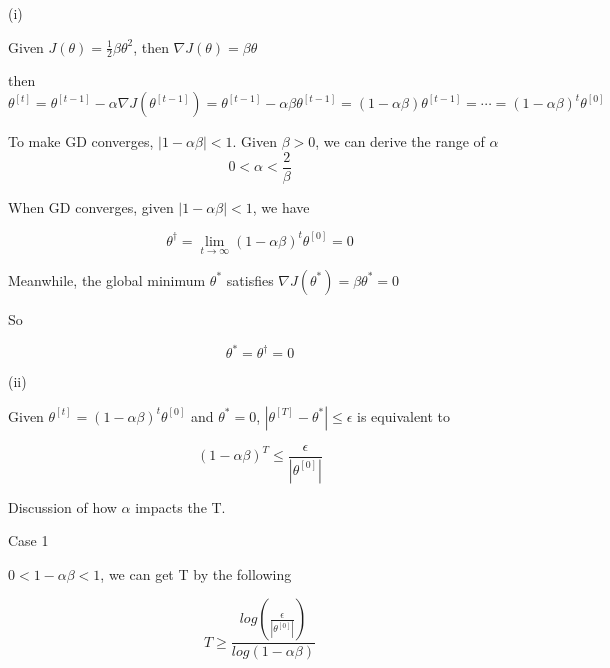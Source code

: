 \begin{answer}

(i)

Given $J(\theta) = \frac{1}{2}\beta\theta^2$, then $\nabla J(\theta) = \beta \theta$

then 
\begin{equation}
    \theta^{[t]} = \theta^{[t-1]} - \alpha\nabla J(\theta^{[t-1]}) = \theta^{[t-1]} - \alpha \beta \theta^{[t-1]} = (1 - \alpha \beta)\theta^{[t-1]} = \cdots = (1 - \alpha \beta) ^ t \theta ^{[0]}
\end{equation}


To make GD converges, $|1 - \alpha \beta| < 1$. Given $\beta > 0$,  we can derive the range of $\alpha$
\begin{equation*}
	0 < \alpha < \frac{2}{\beta}
\end{equation*}

When GD converges, given $|1 - \alpha \beta| < 1$, we have 

\begin{equation*}
	\theta^\dagger = \lim_{t\to\infty} (1 - \alpha \beta) ^ t \theta ^{[0]} = 0
\end{equation*}

Meanwhile, the global minimum $\theta^*$ satisfies $\nabla J(\theta^*) = \beta \theta^* = 0$

So 

\begin{equation*}
	\theta^* = \theta ^ \dagger = 0
\end{equation*}


(ii)

Given $\theta^{[t]} = (1 - \alpha \beta) ^ t \theta ^{[0]}$ and $\theta ^* = 0$, $|\theta^{[T]} - \theta^*| \le \epsilon$ is equivalent to

\begin{equation*}
	 (1 - \alpha \beta) ^ T \le \frac{\epsilon}{|\theta ^{[0]}|}
\end{equation*}

Discussion of how $\alpha$ impacts the T. 

Case 1

$ 0 < 1-\alpha\beta < 1$, we can get T by the following

\begin{equation*}
	 T \ge \frac{log(\frac{\epsilon}{|\theta ^{[0]}|})}{log(1- \alpha\beta)} 
\end{equation*}


\end{answer}
